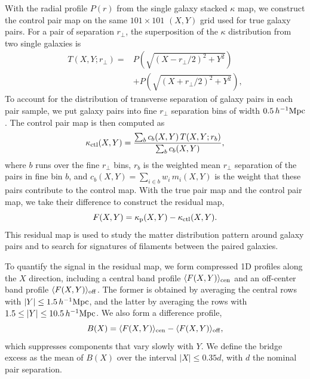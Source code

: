 \documentclass[twocolumn,anonymous,linenumbers]{aastex701}
\newcommand{\hinvMpc}{h^{-1}{\rm Mpc}}
\begin{document}
With the radial profile $P(r)$ from the single galaxy stacked $\kappa$ map, we construct the control pair map on the same $101\times101$ $(X,Y)$ grid used for true galaxy pairs. For a pair of separation $r_{\perp}$, the superposition of the $\kappa$ distribution from two single galaxies is
\begin{eqnarray}
  T(X,Y;r_{\perp})  =& P\!\left(\sqrt{(X-r_{\perp}/2)^{2}+Y^{2}}\right)\nonumber\\
         & + P\!\left(\sqrt{(X+r_{\perp}/2)^{2}+Y^{2}}\right),
  \label{eq:two_halo}
\end{eqnarray}
To account for the distribution of transverse separation of galaxy pairs in each pair sample, we put galaxy pairs into fine $r_\perp$ separation bins of width $0.5\,\hinvMpc$. The control pair map is then computed as
\begin{equation}
  \kappa_{\rm ctl}(X,Y) = \frac{\sum_{b} c_{b}(X,Y)\,T(X,Y;r_{b})}
                               {\sum_{b} c_{b}(X,Y)},
  \label{eq:control}
\end{equation}
where $b$ runs over the fine $r_\perp$ bins, $r_{b}$ is the weighted mean $r_\perp$ separation of the pairs in fine bin $b$, and
$c_{b}(X,Y)=\sum_{i\in b} w_{i}\,m_{i}(X,Y)$ is the weight that these pairs
contribute to the control map. 
With the true pair map and the control pair map, we take their difference to construct the residual map,
\begin{equation}
  F(X,Y) = \kappa_{\rm p}(X,Y)-\kappa_{\rm ctl}(X,Y).
  \label{eq:filament}
\end{equation}
This residual map is used to study the matter distribution pattern around galaxy pairs and to search for signatures of filaments between the
paired galaxies. 

To quantify the signal in the residual map, we form compressed 1D profiles along the $X$ direction, including a central band profile $\langle F(X,Y)\rangle_{\rm cen}$ and an off-center band profile $\langle F(X,Y)\rangle_{\rm off}$. The former is obtained by averaging the central rows with $|Y|\leq1.5\,\hinvMpc$, and the latter by averaging the rows with $1.5\leq|Y|\leq10.5\,\hinvMpc$. We also form a difference profile, 
\begin{equation}
    B(X)=\langle F(X,Y)\rangle_{\rm cen} - \langle F(X,Y)\rangle_{\rm off},
    \label{eq:band}
\end{equation}
which suppresses components that vary slowly with $Y$. We define the bridge excess as the mean of $B(X)$ over the interval $|X|\leq 0.35 d$, with $d$ the nominal pair separation.
\end{document}
